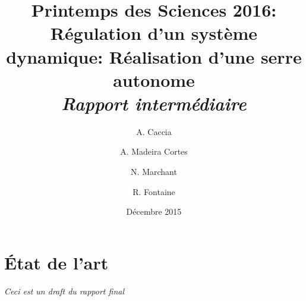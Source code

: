\documentclass[a4paper,10pt]{report}
\title{Printemps des Sciences 2016: \\Régulation d'un système dynamique: Réalisation d'une serre autonome\\\textit{Rapport intermédiaire}}
\author{A. Caccia \and A. Madeira Cortes \and N. Marchant \and R. Fontaine}
\date{Décembre 2015}
\begin{document}
\maketitle

\chapter{État de l'art}
\textit{Ceci est un draft du rapport final}







\printbibliography
\end{document}

